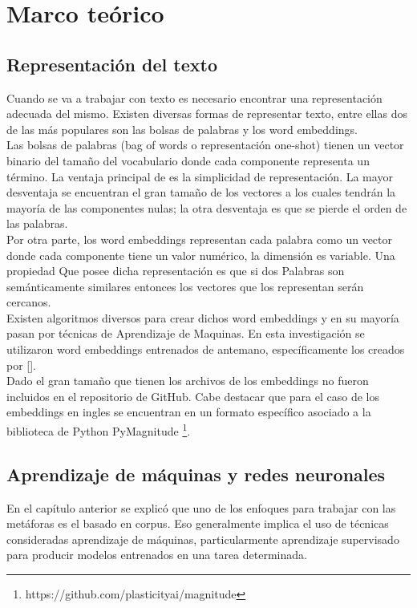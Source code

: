 \chapter{Marco teórico}\label{chapter:proposal}
\section{Representación del texto}
Cuando se va a trabajar con texto es necesario encontrar una representación adecuada del mismo. Existen diversas formas de representar texto, entre ellas dos de las más populares son las bolsas de palabras y los word embeddings. \\
Las bolsas de palabras (bag of words o representación one-shot) tienen un vector binario del tamaño del vocabulario donde cada componente representa un término. La ventaja principal de es la simplicidad de representación. La mayor desventaja se encuentran el gran tamaño de los vectores a los cuales tendrán la mayoría de las componentes nulas; la otra desventaja es que se pierde el orden de las palabras.\\
Por otra parte, los word embeddings representan cada palabra como un vector donde cada componente tiene un valor numérico, la dimensión es variable. Una propiedad Que posee dicha representación es que si dos Palabras son semánticamente similares entonces los vectores que los representan serán cercanos.\\
Existen algoritmos diversos para crear dichos word embeddings y en su mayoría pasan por técnicas de Aprendizaje de Maquinas. En esta investigación se utilizaron word embeddings entrenados de antemano, específicamente los creados por [\cite{MikolovetAl}].\\
 Dado el gran tamaño que tienen los archivos de los embeddings no fueron incluidos en el repositorio de GitHub. Cabe destacar que para el caso de los embeddings en ingles se encuentran en un formato específico asociado a la biblioteca de Python PyMagnitude \footnote{https://github.com/plasticityai/magnitude}.

\section{Aprendizaje de máquinas y redes neuronales}
En el capítulo anterior se explicó que uno de los enfoques para trabajar con las metáforas es el basado en corpus. Eso generalmente implica el uso de técnicas consideradas aprendizaje de máquinas, particularmente aprendizaje supervisado para producir modelos entrenados en una tarea determinada.
